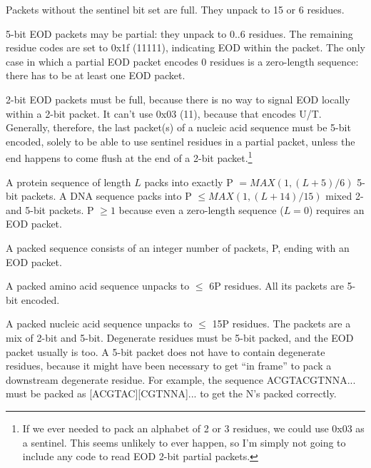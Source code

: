 Packets without the sentinel bit set are full. They unpack to 15 or 6
residues.
 
5-bit EOD packets may be partial: they unpack to 0..6 residues. The
remaining residue codes are set to 0x1f (11111), indicating EOD within
the packet. The only case in which a partial EOD packet encodes 0
residues is a zero-length sequence: there has to be at least one EOD
packet.

2-bit EOD packets must be full, because there is no way to signal EOD
locally within a 2-bit packet. It can't use 0x03 (11), because that
encodes U/T. Generally, therefore, the last packet(s) of a nucleic
acid sequence must be 5-bit encoded, solely to be able to use sentinel
residues in a partial packet, unless the end happens to come flush at
the end of a 2-bit packet.\footnote{If we ever needed to pack an
  alphabet of 2 or 3 residues, we could use 0x03 as a sentinel.  This
  seems unlikely to ever happen, so I'm simply not going to include
  any code to read EOD 2-bit partial packets.}

A protein sequence of length $L$ packs into exactly P $= MAX(1,
(L+5)/6)$ 5-bit packets. A DNA sequence packs into P $\leq MAX(1,
(L+14)/15)$ mixed 2- and 5-bit packets. P $\geq 1$ because even a
zero-length sequence ($L=0$) requires an EOD packet.

A packed sequence consists of an integer number of packets, P, ending
with an EOD packet.
 
A packed amino acid sequence unpacks to $\leq$ 6P residues. All its
packets are 5-bit encoded.
 
A packed nucleic acid sequence unpacks to $\leq$ 15P residues.  The
packets are a mix of 2-bit and 5-bit. Degenerate residues must be
5-bit packed, and the EOD packet usually is too. A 5-bit packet does
not have to contain degenerate residues, because it might have been
necessary to get ``in frame'' to pack a downstream degenerate
residue. For example, the sequence ACGTACGTNNA... must be packed as
[ACGTAC][CGTNNA]... to get the N's packed correctly.
 

